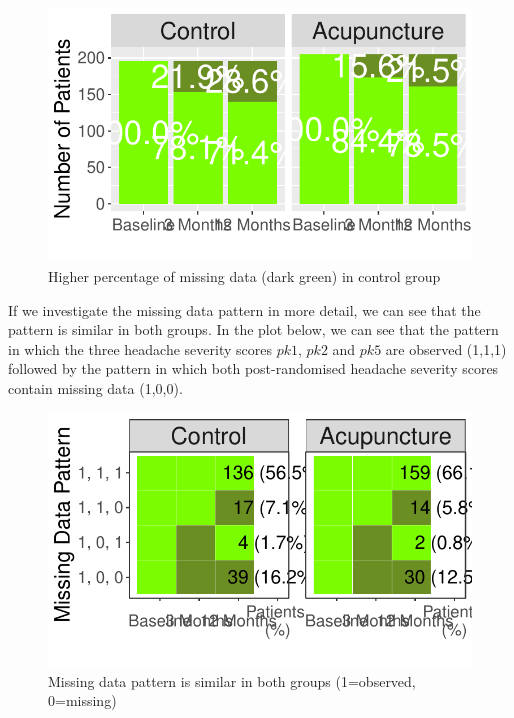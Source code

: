 \documentclass{article}
\newcommand{\pandocbounded}[1]{#1}
\begin{document}
\begin{figure}
\centering
\pandocbounded{\includegraphics[keepaspectratio]{Final_Report_files/figure-latex/unnamed-chunk-25-1.pdf}}
\caption{Higher percentage of missing data (dark green) in control
group}
\end{figure}

If we investigate the missing data pattern in more detail, we can see
that the pattern is similar in both groups. In the plot below, we can
see that the pattern in which the three headache severity scores
\(pk1\), \(pk2\) and \(pk5\) are observed (1,1,1) followed by the
pattern in which both post-randomised headache severity scores contain
missing data (1,0,0).

\begin{figure}
\centering
\pandocbounded{\includegraphics[keepaspectratio]{Final_Report_files/figure-latex/unnamed-chunk-26-1.pdf}}
\caption{Missing data pattern is similar in both groups (1=observed,
0=missing)}
\end{figure}
\end{document}
